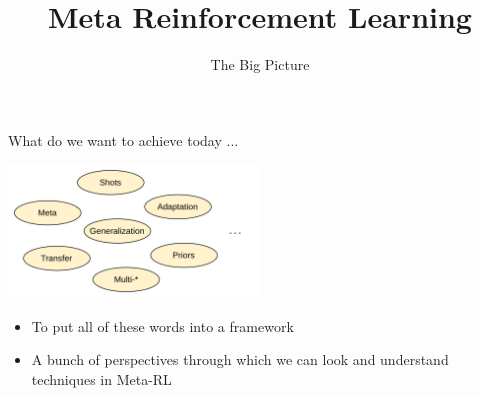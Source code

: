 \documentclass[aspectratio=169]{../latex_main/tntbeamer}  %
\title[Meta-RL]{Meta Reinforcement Learning}
\subtitle{The Big Picture}
\begin{document}
	
	\maketitle

\begin{frame}{What do we want to achieve today ...}

    \centering
    \includegraphics[width=0.5\textwidth]{w09_meta_rl_new/images/t01/Buzz.png}

    \begin{itemize}
        \item To put all of these words into a framework
        \item A bunch of perspectives through which we can look and understand techniques in Meta-RL
    \end{itemize}

\end{frame}
\end{document}
